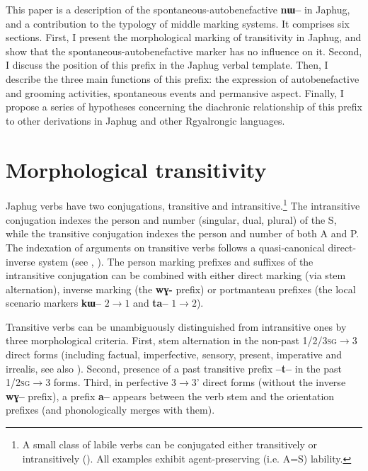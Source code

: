 \documentclass[oldfontcommands,oneside,a4paper,11pt]{article}
\newcommand{\ipa}[1]{\textbf{{\phon\mbox{#1}}}} %
\begin{document}
 
 This paper is a description of the spontaneous-autobenefactive  \ipa{nɯ--}  in Japhug, and a contribution to the typology of middle marking systems. It comprises six sections. First, I present the morphological marking  of transitivity in Japhug, and show that the spontaneous-autobenefactive marker has no influence on it. Second, I discuss the position of this prefix  in the Japhug verbal template. Then, I describe the three main functions of this prefix: the expression of autobenefactive and grooming activities, spontaneous events and permansive aspect. Finally, I propose a series of hypotheses concerning the diachronic relationship of this prefix to other derivations in Japhug and other Rgyalrongic languages. 
 

\section{Morphological transitivity}

Japhug verbs have two conjugations, transitive and intransitive.\footnote{A  small class of labile verbs can be conjugated either transitively or intransitively (\citealt{jacques12demotion}). All examples exhibit agent-preserving  (i.e. A=S) lability.} The intransitive conjugation indexes the person and number (singular, dual, plural) of the S, while the transitive conjugation indexes the person and number of both A and P. The indexation of arguments on transitive verbs follows a quasi-canonical direct-inverse system (see \citealt{delancey81direction, jackson02rentongdengdi, jacques10inverse}, \citealt{jacques14inverse, gongxun14agreement}). The person marking prefixes and suffixes of the intransitive conjugation can be combined with either direct marking (via stem alternation), inverse marking (the \ipa{wɣ-} prefix) or portmanteau prefixes (the local scenario markers \ipa{kɯ--} $2\rightarrow1$ and \ipa{ta--} $1\rightarrow2$).

Transitive verbs can be unambiguously distinguished from intransitive ones by three morphological criteria. First, stem alternation in the non-past  \textsc{1/2/3sg}$\rightarrow$3 direct forms (including factual, imperfective, sensory, present, imperative and irrealis, see also \citealt{jackson00puxi,jackson07irrealis}). Second, presence of a past transitive prefix \ipa{--t--} in the past \textsc{1/2sg}$\rightarrow$3 forms. Third, in perfective 3$\rightarrow$3' direct forms (without the inverse \ipa{wɣ--} prefix), a prefix \ipa{a--}  appears between the verb stem and the orientation prefixes (and phonologically merges with them).
\end{document}
